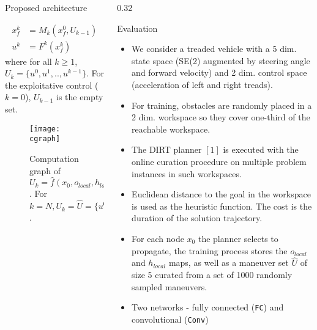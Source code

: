 \begin{columns}[t]
\begin{column}{0.68\textwidth}
\begin{block}{\large Proposed architecture}
\begin{itemize}
			\vspace{-.1in}
			\begin{align*}
				x_f^k &= M_k(x_f^0,U_{k-1}) \\
				u^{k} &= F^k(x_f^k) 
			\end{align*}
			\vspace{-.1in}
			where for all $k \geq 1$, $U_k = \{u^0,u^1,..,u^{k-1}\}$. For the exploitative control ($k=0$), $U_{k-1}$ is the empty set.
			\vspace{0.1in}
			\end{itemize}			
			\begin{figure}[h!]
				\centering
				\texttt{[image: cgraph]}
				\vspace{-.1in}
				\caption{Computation graph of $U_k = \hat{f}(x_0,o_{local},h_{local})$. For $k=N, U_k = \hat{U} = \{u^0,\cdots,u^N\}$.\vspace{-.15in}}
				\label{fig:cgraph}
			\end{figure}
		\end{block}
	\end{column}
	\begin{column} {0.32\textwidth}
		\begin{block}{\large Evaluation}
		\begin{itemize}
			\item We consider a treaded vehicle with a 5 dim. state space (SE(2) augmented by steering angle and forward velocity) and 2 dim. control space (acceleration of left and right treads).
			\item For training, obstacles are randomly placed in a 2 dim. workspace so they cover one-third of the reachable workspace. 
			\item The DIRT planner $[1]$ is executed with the online curation procedure on multiple problem instances in such workspaces. 
			\item Euclidean distance to the goal in the workspace is used as the heuristic function. The cost is the duration of the solution trajectory.
			\item For each node $x_0$ the planner selects to propagate, the training process stores the  $o_{local}$ and $h_{local}$ maps, as well as a maneuver set $\hat{U}$ of size 5 curated from a set of 1000 randomly sampled maneuvers.
			\item Two networks - fully connected (\texttt{FC}) and convolutional (\texttt{Conv})
		\end{itemize}
		\centering
			\vspace{0.2in}

\end{block}
\end{column}
\end{columns}
